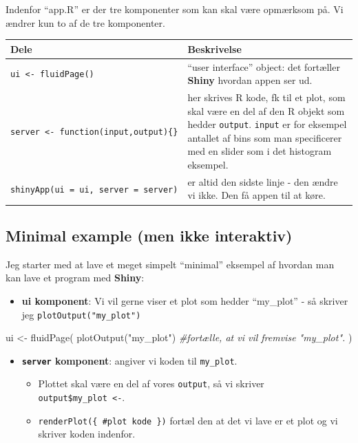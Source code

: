 \documentclass[
]{book}
\newenvironment{Shaded}{\begin{snugshade}}{\end{snugshade}}
\newcommand{\CommentTok}[1]{\textcolor[rgb]{0.56,0.35,0.01}{\textit{#1}}}
\newcommand{\FunctionTok}[1]{\textcolor[rgb]{0.00,0.00,0.00}{#1}}
\newcommand{\NormalTok}[1]{#1}
\newcommand{\OtherTok}[1]{\textcolor[rgb]{0.56,0.35,0.01}{#1}}
\newcommand{\StringTok}[1]{\textcolor[rgb]{0.31,0.60,0.02}{#1}}
\providecommand{\tightlist}{%
  \setlength{\itemsep}{0pt}\setlength{\parskip}{0pt}}
\begin{document}
Indenfor ``app.R'' er der tre komponenter som kan skal være opmærksom på. Vi ændrer kun to af de tre komponenter.

\begin{longtable}[]{@{}
  >{\raggedright\arraybackslash}p{}
  >{\raggedright\arraybackslash}p{}@{}}
\toprule
Dele & Beskrivelse \\
\midrule
\endhead
\texttt{ui\ \textless{}-\ fluidPage()} & ``user interface'' object: det fortæller \textbf{Shiny} hvordan appen ser ud. \\
\texttt{server\ \textless{}-\ function(input,output)\{\}} & her skrives R kode, fk til et plot, som skal være en del af den R objekt som hedder \texttt{output}. \texttt{input} er for eksempel antallet af bins som man specificerer med en slider som i det histogram eksempel. \\
\texttt{shinyApp(ui\ =\ ui,\ server\ =\ server)} & er altid den sidste linje - den ændre vi ikke. Den få appen til at køre. \\
\bottomrule
\end{longtable}

\hypertarget{minimal-example-men-ikke-interaktiv}{%
\subsection{Minimal example (men ikke interaktiv)}\label{minimal-example-men-ikke-interaktiv}}

Jeg starter med at lave et meget simpelt ``minimal'' eksempel af hvordan man kan lave et program med \textbf{Shiny}:

\begin{itemize}
\tightlist
\item
  \textbf{ui komponent}: Vi vil gerne viser et plot som hedder ``my\_plot'' - så skriver jeg \texttt{plotOutput("my\_plot")}
\end{itemize}

\begin{Shaded}
\begin{Highlighting}[]
\NormalTok{ui }\OtherTok{\textless{}{-}} \FunctionTok{fluidPage}\NormalTok{(}
    \FunctionTok{plotOutput}\NormalTok{(}\StringTok{"my\_plot"}\NormalTok{) }\CommentTok{\#fortælle, at vi vil fremvise "my\_plot".}
\NormalTok{)}
\end{Highlighting}
\end{Shaded}

\begin{itemize}
\tightlist
\item
  \textbf{\texttt{server} komponent}: angiver vi koden til \texttt{my\_plot}.

  \begin{itemize}
  \tightlist
  \item
    Plottet skal være en del af vores \texttt{output}, så vi skriver \texttt{output\$my\_plot\ \textless{}-}.
  \item
    \texttt{renderPlot(\{\ \#plot\ kode\ \})} fortæl den at det vi lave er et plot og vi skriver koden indenfor.
  \end{itemize}
\end{itemize}
\end{document}
